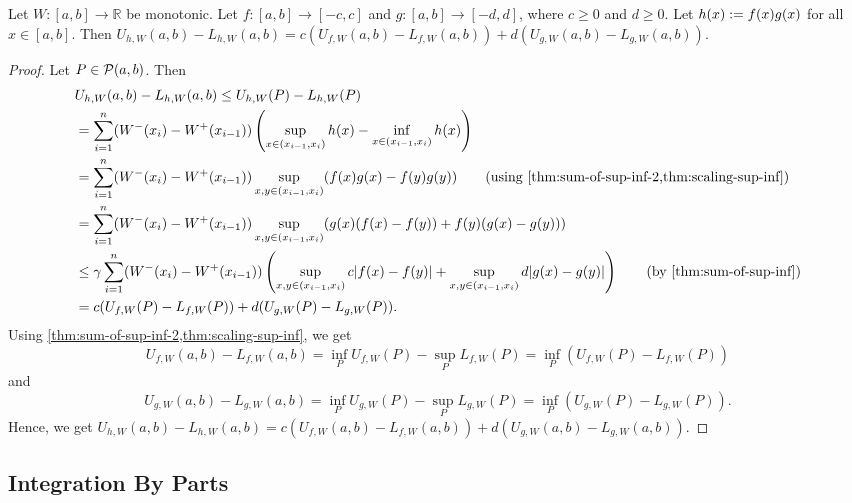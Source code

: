 \documentclass[a4paper,12pt,fleqn]{article}
\begin{document}
\begin{lemma}
\label{thm:dint:prod}
Let $W: [a, b] \to \mathbb{R}$ be monotonic.
Let $f: [a, b] \to [-c, c]$ and $g: [a, b] \to [-d, d]$,
where $c \ge 0$ and $d \ge 0$.
Let $h(x) := f(x)g(x)$ for all $x \in [a, b]$. Then
$U_{h,W}(a, b) - L_{h,W}(a, b) = c(U_{f,W}(a, b) - L_{f,W}(a, b)) + d(U_{g,W}(a, b) - L_{g,W}(a, b))$.
\end{lemma}
\begin{proof}
Let $P \in \mathcal{P}(a, b)$. Then
\begin{align*}
& U_{h,W}(a, b) - L_{h,W}(a, b) \le U_{h,W}(P) - L_{h,W}(P)
\\ &= \sum_{i=1}^n (W^-(x_i) - W^+(x_{i-1}))
    \left(\sup_{x \in (x_{i-1}, x_i)} h(x) - \inf_{x \in (x_{i-1}, x_i)} h(x)\right)
\\ &= \sum_{i=1}^n (W^-(x_i) - W^+(x_{i-1}))
    \sup_{x, y \in (x_{i-1}, x_i)} (f(x)g(x) - f(y)g(y))
    \tag{using \cref{thm:sum-of-sup-inf-2,thm:scaling-sup-inf}}
\\ &= \sum_{i=1}^n (W^-(x_i) - W^+(x_{i-1}))
    \sup_{x, y \in (x_{i-1}, x_i)} (g(x)(f(x) - f(y)) + f(y)(g(x) - g(y)))
\\ &\le \gamma\sum_{i=1}^n (W^-(x_i) - W^+(x_{i-1}))
    \left(\sup_{x, y \in (x_{i-1}, x_i)} c|f(x) - f(y)|
        + \sup_{x, y \in (x_{i-1}, x_i)} d|g(x) - g(y)|\right)
    \tag{by \cref{thm:sum-of-sup-inf}}
\\ &= c(U_{f,W}(P) - L_{f,W}(P)) + d(U_{g,W}(P) - L_{g,W}(P)).
\end{align*}
Using \cref{thm:sum-of-sup-inf-2,thm:scaling-sup-inf}, we get
\[ U_{f,W}(a, b) - L_{f,W}(a, b) = \inf_P U_{f,W}(P) - \sup_P L_{f,W}(P)
= \inf_P (U_{f,W}(P) - L_{f,W}(P)) \]
and
\[ U_{g,W}(a, b) - L_{g,W}(a, b) = \inf_P U_{g,W}(P) - \sup_P L_{g,W}(P)
= \inf_P (U_{g,W}(P) - L_{g,W}(P)). \]
Hence, we get
$U_{h,W}(a, b) - L_{h,W}(a, b) = c(U_{f,W}(a, b) - L_{f,W}(a, b)) + d(U_{g,W}(a, b) - L_{g,W}(a, b))$.
\end{proof}

\subsection{Integration By Parts}
\end{document}
